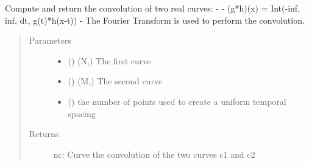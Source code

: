 \documentclass[letterpaper,10pt,english]{sphinxmanual}
\begin{document}

\begin{fulllineitems}
\label{\detokenize{pydv:pydvpy.convolve}}
Compute and return the convolution of two real curves:
-
-   (g*h)(x) = Int(-inf, inf, dt, g(t)*h(x-t))
-
The Fourier Transform is used to perform the convolution.

\begin{sphinxVerbatim}[commandchars=\\\{\}]
  
\end{sphinxVerbatim}

\begin{sphinxVerbatim}[commandchars=\\\{\}]
  \PYG{p}{[}\PYG{p}{]} \PYG{p}{[}\PYG{p}{]}
\end{sphinxVerbatim}
\begin{quote}\begin{description}
\item[{Parameters}] \leavevmode\begin{itemize}
\item {} 
 ({\hyperref[\detokenize{pydv:curve.Curve}]{}}) \textendash{} (N,) The first curve

\item {} 
 ({\hyperref[\detokenize{pydv:curve.Curve}]{}}) \textendash{} (M,) The second curve

\item {} 
 () \textendash{} the number of points used to create a uniform temporal spacing

\end{itemize}

\item[{Returns}] \leavevmode
nc: Curve \textendash{} the convolution of the two curves c1 and c2

\end{description}\end{quote}

\end{fulllineitems}
\end{document}
